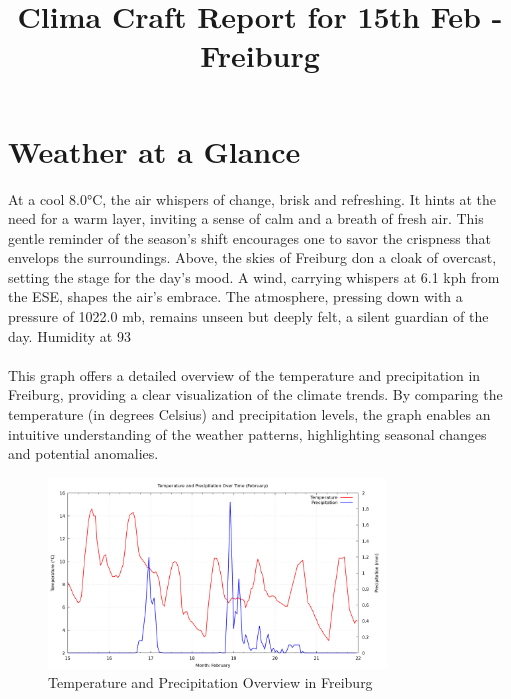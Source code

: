 \documentclass[11pt]{article}
\title{\textbf{\Huge Clima Craft Report for 15th Feb - Freiburg}}  %
\date{}
\begin{document}
    \maketitle

    \thispagestyle{fancy}
    \section*{Weather at a Glance }
At a cool 8.0°C, the air whispers of change, brisk and refreshing. It hints at the need for a warm layer, inviting a sense of calm and a breath of fresh air. This gentle reminder of the season's shift encourages one to savor the crispness that envelops the surroundings. Above, the skies of Freiburg don a cloak of overcast, setting the stage for the day's mood. A wind, carrying whispers at 6.1 kph from the ESE, shapes the air's embrace. The atmosphere, pressing down with a pressure of 1022.0 mb, remains unseen but deeply felt, a silent guardian of the day. Humidity at 93%
\paragraph{}This graph offers a detailed overview of the temperature and precipitation in Freiburg, providing a clear visualization of the climate trends. By comparing the temperature (in degrees Celsius) and precipitation levels, the graph enables an intuitive understanding of the weather patterns, highlighting seasonal changes and potential anomalies.
\begin{figure}[h]
\centering
\includegraphics[width=0.8\textwidth]{data/graph/temperature_precipitation_graph.png}
\caption{Temperature and Precipitation Overview in Freiburg}
\end{figure}
\end{document}
